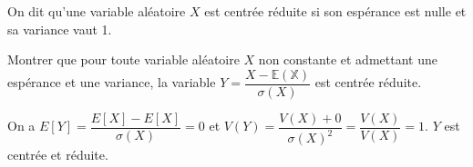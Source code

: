\documentclass[11pt,fleqn, openany]{book} %
\begin{document}
\begin{exercise}[topic=lgn02]On dit qu'une variable aléatoire $X$ est centrée réduite si son espérance est nulle et sa variance vaut 1. 

Montrer que pour toute variable aléatoire $X$ non constante et admettant une espérance et une variance, la variable $Y=\dfrac{X-\mathbb{E(X)}}{\sigma (X)}$ est centrée réduite.\newpage \end{exercise}

\begin{solution}On a $E[Y]=\dfrac{E[X]-E[X]}{\sigma(X)}=0$ et $V(Y) = \dfrac{V(X)+0}{\sigma(X)^2}=\dfrac{V(X)}{V(X)}=1$. $Y$ est centrée et réduite.\end{solution}
\end{document}
